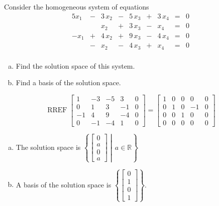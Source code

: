 
\begin{exerciseStatement}


Consider the homogeneous system of equations 
\begin{alignat*}{5} x_{1} &-& 3 \, x_{2} &-& 5 \, x_{3} &+& 3 \, x_{4} &=& 0 \\ & & x_{2} &+& 3 \, x_{3} &-& x_{4} &=& 0 \\-x_{1} &+& 4 \, x_{2} &+& 9 \, x_{3} &-& 4 \, x_{4} &=& 0 \\ &-& x_{2} &-& 4 \, x_{3} &+& x_{4} &=& 0 \\ \end{alignat*}
            


\begin{enumerate}[(a)]
\item  Find the solution space of this system.
\item  Find a basis of the solution space.
\end{enumerate}
    
\end{exerciseStatement}
    
\begin{exerciseAnswer} 


\[\operatorname{RREF} \left[\begin{array}{cccc|c}
1 & -3 & -5 & 3 & 0 \\
0 & 1 & 3 & -1 & 0 \\
-1 & 4 & 9 & -4 & 0 \\
0 & -1 & -4 & 1 & 0
\end{array}\right] = \left[\begin{array}{cccc|c}
1 & 0 & 0 & 0 & 0 \\
0 & 1 & 0 & -1 & 0 \\
0 & 0 & 1 & 0 & 0 \\
0 & 0 & 0 & 0 & 0
\end{array}\right] \]


\begin{enumerate}[(a)]
\item The solution space is \( \left\{ \left[\begin{array}{c}
0 \\
a \\
0 \\
a
\end{array}\right] \middle|\,a\in\mathbb{R}\right\} \)
\item A basis of the solution space is \( \left\{ \left[\begin{array}{c}
0 \\
1 \\
0 \\
1
\end{array}\right] \right\} \).
\end{enumerate}
    
\end{exerciseAnswer}
    

